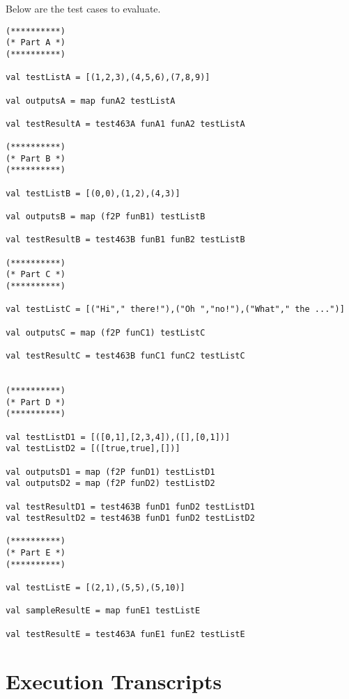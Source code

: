 \documentclass{report}
\begin{document}
Below are the test cases to evaluate.
\begin{lstlisting}[frame = TB]
(**********)
(* Part A *)
(**********)

val testListA = [(1,2,3),(4,5,6),(7,8,9)]

val outputsA = map funA2 testListA

val testResultA = test463A funA1 funA2 testListA

(**********)
(* Part B *)
(**********)

val testListB = [(0,0),(1,2),(4,3)]

val outputsB = map (f2P funB1) testListB

val testResultB = test463B funB1 funB2 testListB

(**********)
(* Part C *)
(**********)

val testListC = [("Hi"," there!"),("Oh ","no!"),("What"," the ...")]

val outputsC = map (f2P funC1) testListC

val testResultC = test463B funC1 funC2 testListC


(**********)
(* Part D *)
(**********)

val testListD1 = [([0,1],[2,3,4]),([],[0,1])]
val testListD2 = [([true,true],[])]

val outputsD1 = map (f2P funD1) testListD1
val outputsD2 = map (f2P funD2) testListD2

val testResultD1 = test463B funD1 funD2 testListD1
val testResultD2 = test463B funD1 funD2 testListD2

(**********)
(* Part E *)
(**********)

val testListE = [(2,1),(5,5),(5,10)]

val sampleResultE = map funE1 testListE

val testResultE = test463A funE1 funE2 testListE

\end{lstlisting}


\section{Execution Transcripts}
\label{sec:exec-transcr}
\end{document}
